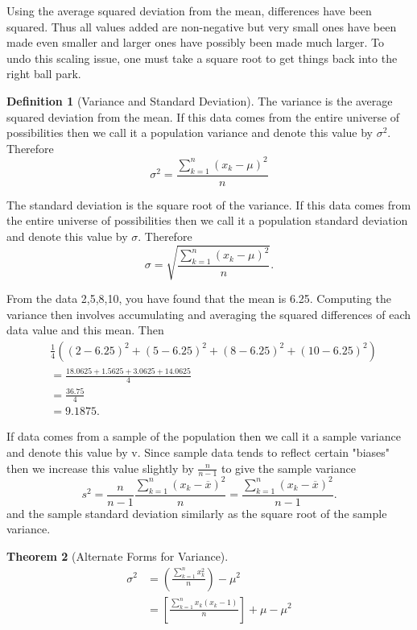 \documentclass[10pt,]{book}
\theoremstyle{plain}
\newtheorem{theorem}{Theorem}[section]
\theoremstyle{definition}
\newtheorem{definition}[theorem]{Definition}
\theoremstyle{definition}
\numberwithin{equation}{section}
\begin{document}
Using the average squared deviation from the mean, differences have been squared. Thus all values added are non-negative but very small ones have been made even smaller and larger ones have possibly been made much larger. To undo this scaling issue, one must take a square root to get things back into the right ball park. 
%
\begin{definition}[Variance and Standard Deviation]\label{definition-14}
The variance is the average squared deviation from the mean. If this data comes from the entire universe of possibilities then we call it a population variance and denote this value by \(\sigma^2\). Therefore
	\begin{equation*} \sigma^2 = \frac{\sum_{k=1}^n ( x_k-\mu )^2}{n} \end{equation*}
%
\par
The standard deviation is the square root of the variance. If this data comes from the entire universe of possibilities then we call it a population standard deviation and denote this value by \(\sigma\). Therefore
\begin{equation*} \sigma = \sqrt{\frac{\sum_{k=1}^n ( x_k-\mu )^2}{n}}.\end{equation*}
%
\par
From the data {2,5,8,10}, you have found that the mean is 6.25. Computing the variance then involves accumulating and averaging the squared differences of each data value and this mean. Then
\begin{align*}
& \frac{1}{4} \left ( (2-6.25)^2 + (5-6.25)^2 + (8-6.25)^2 + (10-6.25)^2 \right ) \\
& = \frac{18.0625 + 1.5625 + 3.0625 + 14.0625}{4} \\
& = \frac{36.75}{4}\\
& = 9.1875.
\end{align*}
\par

If data comes from a sample of the population then we call it a sample variance and denote this value by v. Since sample data tends to reflect certain "biases" then we increase this value slightly by \(\frac{n}{n-1}\) to give the sample variance
\begin{equation*}s^2 = \frac{n}{n-1}\frac{\sum_{k=1}^n ( x_k-\overline{x} )^2}{n} = \frac{\sum_{k=1}^n ( x_k-\overline{x} )^2}{n-1}.\end{equation*}
and the sample standard deviation similarly as the square root of the sample variance.
%
\end{definition}
\begin{theorem}[Alternate Forms for Variance]\label{theorem-7}
\begin{align*}
\sigma^2 & = \left ( \frac{\sum_{k=1}^n x_k^2 }{n} \right ) - \mu^2 \\
& = \left [ \frac{\sum_{k=1}^n x_k(x_k - 1)}{n} \right ] + \mu - \mu^2
\end{align*}\end{theorem}
\end{document}

